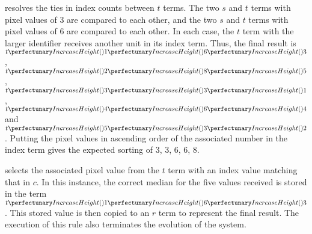  resolves the ties in index counts between \(t\) terms.  The two \(s\) and \(t\) terms with pixel values of 3 are compared to each other, and the two \(s\) and \(t\) terms with pixel values of 6 are compared to each other.  In each case, the \(t\) term with the larger identifier receives another unit in its index term.  Thus, the final result is \(\cpfuncnn{t}{1}{6}{3}\), \(\cpfuncnn{t}{2}{8}{5}\), \(\cpfuncnn{t}{3}{3}{1}\), \(\cpfuncnn{t}{4}{6}{4}\) and \(\cpfuncnn{t}{5}{3}{2}\).  Putting the pixel values in ascending order of the associated number in the index term gives the expected sorting of 3, 3, 6, 6, 8.

 selects the associated pixel value from the \(t\) term with an index value matching that in \(c\).  In this instance, the correct median for the five values received is stored in the term \(\cpfuncnn{t}{1}{6}{3}\).  This stored value is then copied to an \(r\) term to represent the final result.  The execution of this rule also terminates the evolution of the system.